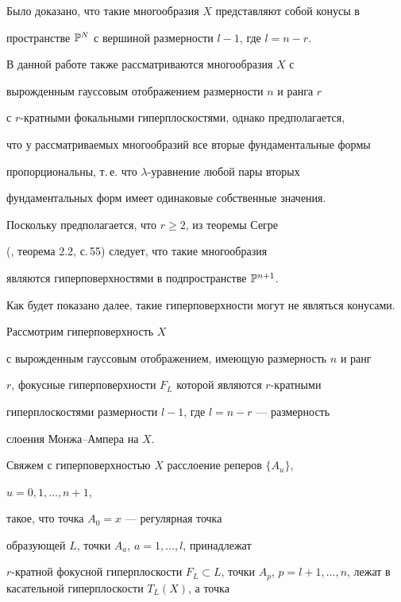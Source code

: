 Было доказано, что такие многообразия $X$ представляют собой конусы в


пространстве ${\Bbb P}^N$ с вершиной размерности $l - 1$, где $l = n - r$.





В данной работе также рассматриваются многообразия $X$ с


вырожденным гауссовым отображением размерности $n$ и ранга $r$


с $r$-кратными фокальными гиперплоскостями, однако предполагается,


что у рассматриваемых многообразий все вторые фундаментальные формы


пропорциональны, т.\,е. что $\lambda$-уравнение любой пары вторых


фундаментальных форм имеет одинаковые собственные значения.





Поскольку предполагается, что $r \geq 2$, из теоремы Сегре


(\cite{AG93}, теорема 2.2, с.\,55) следует, что такие многообразия


являются гиперповерхностями в подпространстве ${\Bbb P}^{n+1}$.


Как будет показано далее, такие гиперповерхности могут не являться конусами.





Рассмотрим гиперповерхность  $X$


с вырожденным гауссовым отображением, имеющую размерность  $n$ и ранг


$r$, фокусные гиперповерхности  $F_L$ которой являются $r$-кратными


гиперплоскостями размерности  $l-1$, где $l = n - r$ --- размерность


слоения Монжа--Ампера на $X$.


Свяжем с гиперповерхностью  $X$  расслоение реперов  $\{A_u\}$,


$u = 0, 1, \dotsc , n + 1$,


такое, что точка  $A_0=x$ --- регулярная точка


образующей  $L$, точки $A_a$, $a = 1, \dotsc, l$, принадлежат


$r$-кратной фокусной гиперплоскости $F_L\subset L$, точки $A_p$, $p = l +


1, \dotsc, n$, лежат в касательной гиперплоскости $T_L (X)$, а точка


